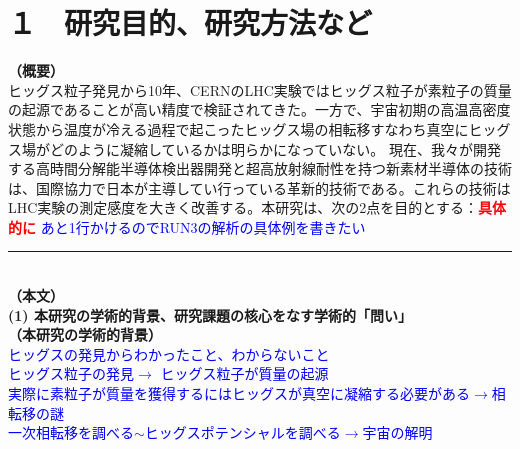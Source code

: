 \documentclass[11pt,a4j,dvipdfmx]{jarticle} 					%
\newcommand{\研究課題名}{新型半導体検出器を用いた真空の解明}
\newcommand{\研究機関名}{高エネルギー加速器研究機構}
\newcommand{\研究代表者氏名}{中村浩二}
\newcommand{\研究期間の最終元号年度}{10}  %
\newcommand{\TODO}[1]{\textcolor{red}{#1}}
\newcommand{\MEMO}[1]{\textcolor{blue}{#1}}
\begin{document}

\section{１　研究目的、研究方法など}

\noindent
\textbf{（概要）}\\
ヒッグス粒子発見から10年、CERNのLHC実験ではヒッグス粒子が素粒子の質量の起源であることが高い精度で検証されてきた。一方で、宇宙初期の高温高密度状態から温度が冷える過程で起こったヒッグス場の相転移すなわち真空にヒッグス場がどのように凝縮しているかは明らかになっていない。
\textbf{}現在、我々が開発する高時間分解能半導体検出器開発と超高放射線耐性を持つ新素材半導体の技術は、国際協力で日本が主導してい行っている革新的技術である。これらの技術はLHC実験の測定感度を大きく改善する。本研究は、次の2点を目的とする：\textbf{\TODO{具体的に} }
\MEMO{あと1行かけるのでRUN3の解析の具体例を書きたい}
 \vspace*{0zw}	%

\noindent
\rule{\linewidth}{1pt}\\
\noindent
\textbf{（本文）}\\
\noindent\colorbox[gray]{0.9}{\textbf{(1) 本研究の学術的背景、研究課題の核心をなす学術的「問い」}}\\
\noindent\textbf{（本研究の学術的背景）}\\
\MEMO{
ヒッグスの発見からわかったこと、わからないこと\\
ヒッグス粒子の発見$\to$ ヒッグス粒子が質量の起源\\
実際に素粒子が質量を獲得するにはヒッグスが真空に凝縮する必要がある$\to$相転移の謎\\
一次相転移を調べる$\sim$ヒッグスポテンシャルを調べる$\to$宇宙の解明\\
}
\end{document}
